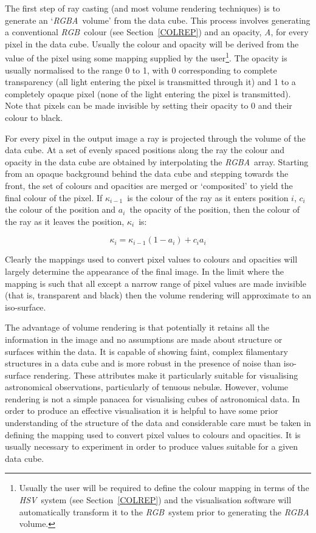 \documentclass[twoside,11pt]{article}
\begin{document}
The first step of ray casting (and most volume rendering techniques)
is to generate an `{\it RGBA}\, volume' from the data cube. This
process involves generating a conventional {\it RGB}\, colour (see
Section~\ref{COLREP}) and an opacity, {\it A}, for every pixel in the
data cube. Usually the colour and opacity will be derived from the
value of the pixel using some mapping supplied by the
user\footnote{Usually the user will be required to define the colour
mapping in terms of the {\it HSV}\, system (see Section~\ref{COLREP})
and the visualisation software will automatically transform it to the
{\it RGB}\, system prior to generating the {\it RGBA}\, volume.}. The
opacity is usually normalised to the range 0 to 1, with 0 corresponding
to complete transparency (all light entering the pixel is transmitted
through it) and 1 to a completely opaque pixel (none of the light
entering the pixel is transmitted). Note that pixels can be made invisible
by setting their opacity to 0 and their colour to black.

For every pixel in the output image a ray is projected through the
volume of the data cube. At a set of evenly spaced positions along the
ray the colour and opacity in the data cube are obtained by
interpolating the {\it RGBA}\, array. Starting from an opaque background
behind the data cube and stepping towards the front, the set of colours
and opacities are merged or `composited' to yield the final colour of
the pixel. If $\kappa_{i-1}$\, is the colour of the ray as it enters position
$i$, $c_{i}$ the colour of the position and $a_{i}$\, the opacity
of the position, then the colour of the ray as it leaves the position,
$\kappa_{i}$\, is:

\begin{equation}
\kappa_{i} = \kappa_{i-1} ( 1 - a_{i} ) + c_{i} a_{i}
\end{equation}

Clearly the mappings used to convert pixel values to colours and
opacities will largely determine the appearance of the final image.
In the limit where the mapping is such that all except a narrow range of
pixel values are made invisible (that is, transparent and black) then
the volume rendering will approximate to an iso-surface.

The advantage of volume rendering is that potentially it retains all the
information in the image and no assumptions are made about structure or
surfaces within the data. It is capable of showing faint, complex
filamentary structures in a data cube and is more robust in the presence
of noise than iso-surface rendering. These attributes make it particularly
suitable for visualising astronomical observations, particularly of
tenuous nebul\ae. However, volume rendering is not a simple panacea for
visualising cubes of astronomical data. In order to produce an effective
visualisation it is helpful to have some prior understanding of the
structure of the data and considerable care must be taken in defining
the mapping used to convert pixel values to colours and opacities.
It is usually necessary to experiment in order to produce values suitable
for a given data cube.
\end{document}
